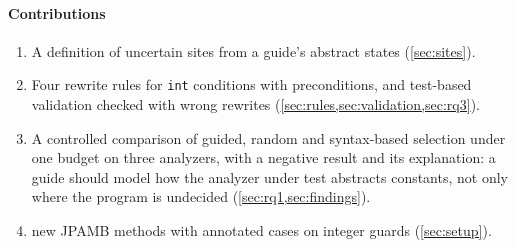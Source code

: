 \paragraph{Contributions}
\begin{enumerate}
  \item A definition of uncertain sites from a guide's abstract states
    (\cref{sec:sites}).
  \item Four rewrite rules for \texttt{int} conditions with preconditions, and
    test-based validation checked with wrong rewrites
    (\cref{sec:rules,sec:validation,sec:rq3}).
  \item A controlled comparison of guided, random and syntax-based selection
    under one budget on three analyzers, with a negative result and its
    explanation: a guide should model how the analyzer under test abstracts
    constants, not only where the program is undecided
    (\cref{sec:rq1,sec:findings}).
  \item \NumGuardsMethods{} new JPAMB methods with \NumGuardsCases{} annotated
    cases on integer guards (\cref{sec:setup}).
\end{enumerate}
